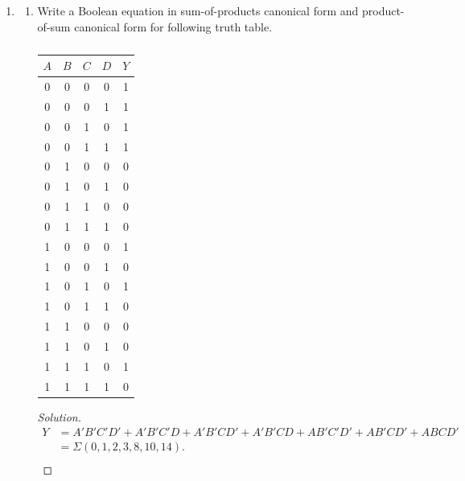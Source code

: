 \documentclass{zc-ust-hw}
\newenvironment{solution}
  {\renewcommand\qedsymbol{$\blacksquare$}\begin{proof}[Solution]}
  {\end{proof}}
\begin{document}
\maketitle

\begin{enumerate}

  \item 
    \begin{enumerate}[label=\alph*.]
      \item Write a Boolean equation in sum-of-products canonical form and
        product-of-sum canonical form for following truth table. 
        \begin{table}[htpb]
          \centering
          \begin{tabular}{cccc|c}
            $A$ & $B$ & $C$ & $D$ & $Y$ \\
            \hline
            0 & 0 & 0 & 0 & 1 \\
            0 & 0 & 0 & 1 & 1 \\
            0 & 0 & 1 & 0 & 1 \\
            0 & 0 & 1 & 1 & 1 \\
            0 & 1 & 0 & 0 & 0 \\
            0 & 1 & 0 & 1 & 0 \\
            0 & 1 & 1 & 0 & 0 \\
            0 & 1 & 1 & 1 & 0 \\
            1 & 0 & 0 & 0 & 1 \\
            1 & 0 & 0 & 1 & 0 \\
            1 & 0 & 1 & 0 & 1 \\
            1 & 0 & 1 & 1 & 0 \\
            1 & 1 & 0 & 0 & 0 \\
            1 & 1 & 0 & 1 & 0 \\
            1 & 1 & 1 & 0 & 1 \\
            1 & 1 & 1 & 1 & 0 \\
          \end{tabular}
          \caption{}
          \label{tab:1}
        \end{table}
        \begin{solution}
          \begin{align}
            Y &= A'B'C'D'+A'B'C'D+A'B'CD'+A'B'CD+AB'C'D'+AB'CD'+ABCD' \\
            &= \Sigma(0,1,2,3,8,10,14)
          .\end{align}
          \begin{align}

\end{align}
\end{solution}
\end{enumerate}
\end{enumerate}
\end{document}
